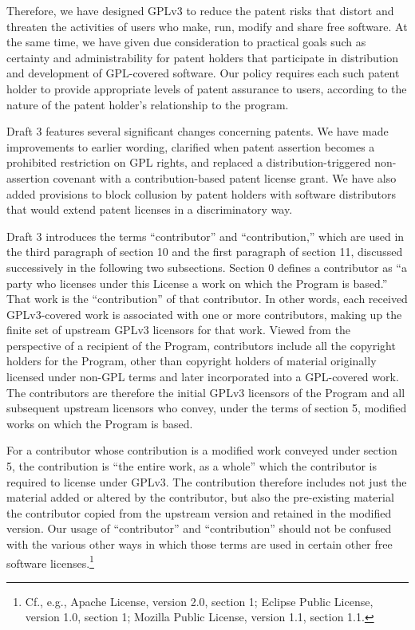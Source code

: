 Therefore, we have designed GPLv3 to reduce the patent risks that distort and
threaten the activities of users who make, run, modify and share free
software.  At the same time, we have given due consideration to practical
goals such as certainty and administrability for patent holders that
participate in distribution and development of GPL-covered software.  Our
policy requires each such patent holder to provide appropriate levels of
patent assurance to users, according to the nature of the patent holder's
relationship to the program.

Draft 3 features several significant changes concerning patents.  We have
made improvements to earlier wording, clarified when patent assertion becomes
a prohibited restriction on GPL rights, and replaced a distribution-triggered
non-assertion covenant with a contribution-based patent license grant. We
have also added provisions to block collusion by patent holders with software
distributors that would extend patent licenses in a discriminatory way.


Draft 3 introduces the terms ``contributor'' and ``contribution,'' which are
used in the third paragraph of section 10 and the first paragraph of section
11, discussed successively in the following two subsections.  Section 0
defines a contributor as ``a party who licenses under this License a work on
which the Program is based.'' That work is the ``contribution'' of that
contributor.  In other words, each received GPLv3-covered work is associated
with one or more contributors, making up the finite set of upstream GPLv3
licensors for that work. Viewed from the perspective of a recipient of the
Program, contributors include all the copyright holders for the Program,
other than copyright holders of material originally licensed under non-GPL
terms and later incorporated into a GPL-covered work.  The contributors are
therefore the initial GPLv3 licensors of the Program and all subsequent
upstream licensors who convey, under the terms of section 5, modified works
on which the Program is based.

For a contributor whose contribution is a modified work conveyed under
section 5, the contribution is ``the entire work, as a whole'' which the
contributor is required to license under GPLv3.  The contribution therefore
includes not just the material added or altered by the contributor, but also
the pre-existing material the contributor copied from the upstream version
and retained in the modified version. Our usage of ``contributor'' and
``contribution'' should not be confused with the various other ways in which
those terms are used in certain other free software licenses.\footnote{Cf.,
  e.g., Apache License, version 2.0, section 1; Eclipse Public License,
  version 1.0, section 1; Mozilla Public License, version 1.1, section 1.1.}


